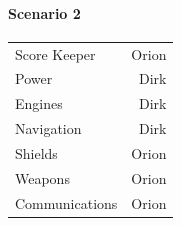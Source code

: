 \documentclass[10pt]{article}
\begin{document}
\paragraph*{Scenario 2}
\begin{tabular}{l r}
   Score Keeper & Orion \\
   Power & Dirk \\
   Engines & Dirk \\
   Navigation & Dirk \\
   Shields & Orion \\
   Weapons & Orion \\
   Communications & Orion \\
\end{tabular}
\end{document}
